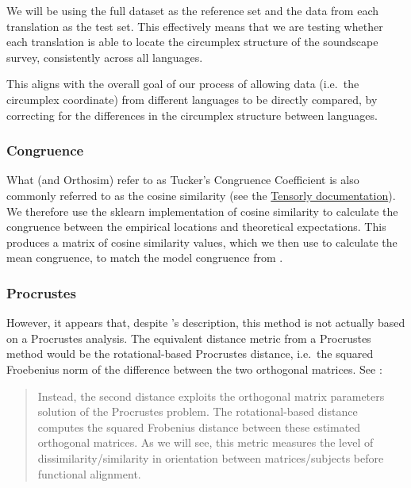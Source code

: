 \documentclass[
  authoryear,
  preprint,
  3p]{elsarticle}
\begin{document}
We will be using the full dataset as the reference set and the data from
each translation as the test set. This effectively means that we are
testing whether each translation is able to locate the circumplex
structure of the soundscape survey, consistently across all languages.

This aligns with the overall goal of our process of allowing data
(i.e.~the circumplex coordinate) from different languages to be directly
compared, by correcting for the differences in the circumplex structure
between languages.

\subsubsection{Congruence}\label{congruence}

What \citet{Rogoza2021three} (and Orthosim) refer to as Tucker's
Congruence Coefficient is also commonly referred to as the cosine
similarity (see the
\href{https://tensorly.org/stable/modules/generated/tensorly.metrics.factors.congruence_coefficient.html}{Tensorly
documentation}). We therefore use the sklearn implementation of cosine
similarity to calculate the congruence between the empirical locations
and theoretical expectations. This produces a matrix of cosine
similarity values, which we then use to calculate the mean congruence,
to match the model congruence from \citet{Rogoza2021three}.

\subsubsection{Procrustes}\label{procrustes}

However, it appears that, despite \citet{Rogoza2021three} 's
description, this method is not actually based on a Procrustes analysis.
The equivalent distance metric from a Procrustes method would be the
rotational-based Procrustes distance, i.e.~the squared Froebenius norm
of the difference between the two orthogonal matrices. See
\citet{Andreella2023Procrustes}:

\begin{quote}
Instead, the second distance exploits the orthogonal matrix parameters
solution of the Procrustes problem. The rotational-based distance
computes the squared Frobenius distance between these estimated
orthogonal matrices. As we will see, this metric measures the level of
dissimilarity/similarity in orientation between matrices/subjects before
functional alignment.
\end{quote}
\end{document}
